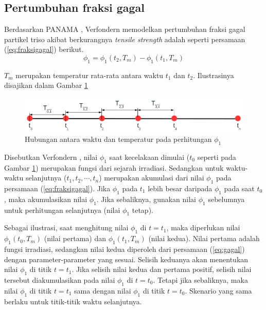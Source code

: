 \documentclass[a4paper,11pt]{report}
\begin{document}
\subsection{Pertumbuhan fraksi gagal}
Berdasarkan PANAMA \cite{report1}, Verfondern memodelkan pertumbuhan fraksi gagal partikel triso akibat berkurangnya \textit{tensile strength} adalah seperti persamaan (\ref{eq:fraksigagal}) berikut.
\begin{equation}
\phi_1=\phi_1(t_2,T_m)-\phi_1(t_1,T_m)
\label{eq:fraksigagal}
\end{equation}

$T_m$ merupakan temperatur rata-rata antara waktu $t_1$ dan $t_2$. Ilustrasinya disajikan dalam Gambar \ref{fig:pertumbuhanPhi} 
\begin{figure}
  \begin{center}
    \includegraphics[scale=.5]{pics/akumulasiPhi.png}
    \caption{Hubungan antara waktu dan temperatur pada perhitungan $\phi_1$}
    \label{fig:pertumbuhanPhi}
  \end{center}
\end{figure}

Disebutkan Verfondern \cite{report1}, nilai $\phi_1$ saat kecelakaan dimulai ($t_0$ seperti pada Gambar \ref{fig:pertumbuhanPhi}) merupakan fungsi dari sejarah irradiasi. Sedangkan untuk waktu-waktu selanjutnya ($t_1, t_2, \cdots, t_n$) merupakan akumulasi dari nilai $\phi_1$ pada persamaan (\ref{eq:fraksigagal}). Jika $\phi_1$ pada $t_1$ lebih besar daripada $\phi_1$ pada saat $t_0$, maka akumulasikan nilai $\phi_1$. Jika sebaliknya, gunakan nilai $\phi_1$ sebelumnya untuk perhitungan selanjutnya (nilai $\phi_1$ tetap). 

Sebagai ilustrasi, saat menghitung nilai $\phi_1$ di $t=t_1$, maka diperlukan nilai $\phi_1(t_0, T_m)$ (nilai pertama) dan $\phi_1(t_1, T_m)$ (nilai kedua). Nilai pertama adalah fungsi irradiasi, sedangkan nilai kedua diperoleh dari persamaan (\ref{eq:gagal}) dengan parameter-parameter yang sesuai. Selisih keduanya akan menentukan nilai $\phi_1$ di titik $t=t_1$. Jika selisih nilai kedua dan pertama positif, selisih nilai tersebut diakumulasikan pada nilai $\phi_1$ di $t=t_0$. Tetapi jika sebaliknya, maka nilai $\phi_1$ di titik $t=t_1$ sama dengan nilai $\phi_1$ di titik $t=t_0$. Skenario yang sama berlaku untuk titik-titik waktu selanjutnya.
\end{document}
